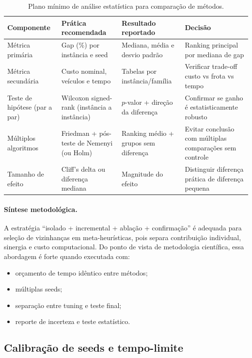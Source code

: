 \begin{table}[htbp]
\centering
\caption{Plano mínimo de análise estatística para comparação de métodos.}
\label{tab:statistical_plan}
\begin{tabular}{p{3.2cm}p{3.8cm}p{3.7cm}p{3.8cm}}
\hline
Componente & Prática recomendada & Resultado reportado & Decisão \\
\hline
Métrica primária & Gap (\%) por instância e seed & Mediana, média e desvio padrão & Ranking principal por mediana de gap \\
Métrica secundária & Custo nominal, veículos e tempo & Tabelas por instância/família & Verificar trade-off custo vs frota vs tempo \\
Teste de hipótese (par a par) & Wilcoxon signed-rank (instância a instância) & $p$-valor + direção da diferença & Confirmar se ganho é estatisticamente robusto \\
Múltiplos algoritmos & Friedman + pós-teste de Nemenyi (ou Holm) & Ranking médio + grupos sem diferença & Evitar conclusão com múltiplas comparações sem controle \\
Tamanho de efeito & Cliff's delta ou diferença mediana & Magnitude do efeito & Distinguir diferença prática de diferença pequena \\
\hline
\end{tabular}
\end{table}

\paragraph{Síntese metodológica.}
A estratégia ``isolado + incremental + ablação + confirmação'' é adequada para seleção de vizinhanças em meta-heurísticas, pois separa contribuição individual, sinergia e custo computacional.
Do ponto de vista de metodologia científica, essa abordagem é forte quando executada com:
\begin{itemize}
  \item orçamento de tempo idêntico entre métodos;
  \item múltiplas seeds;
  \item separação entre tuning e teste final;
  \item reporte de incerteza e teste estatístico.
\end{itemize}

\subsection{Calibração de seeds e tempo-limite}
\label{subsec:calibracao_seed_tempo}

